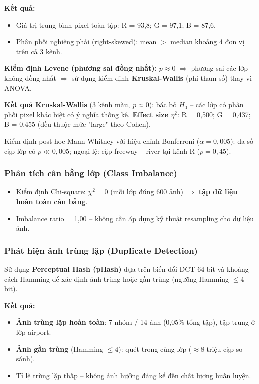 \documentclass[12pt,a4paper]{article}
\let\oldtextbf\textbf
\renewcommand{\textbf}[1]{\oldtextbf{\textcolor{hcmublue}{#1}}}
\begin{document}
\textbf{Kết quả:}
\begin{itemize}
    \item Giá trị trung bình pixel toàn tập: R = 93,8; G = 97,1; B = 87,6.
    \item Phân phối nghiêng phải (right-skewed): mean $>$ median khoảng 4 đơn vị trên cả 3 kênh.
\end{itemize}

\textbf{Kiểm định Levene (phương sai đồng nhất):} $p \approx 0$ $\Rightarrow$ phương sai các lớp không đồng nhất $\Rightarrow$ sử dụng kiểm định \textbf{Kruskal-Wallis} (phi tham số) thay vì ANOVA.

\textbf{Kết quả Kruskal-Wallis} (3 kênh màu, $p \approx 0$): bác bỏ $H_0$ -- các lớp có phân phối pixel khác biệt có ý nghĩa thống kê. \textbf{Effect size $\eta^2$}: R = 0,500; G = 0,437; B = 0,455 (đều thuộc mức "large" theo Cohen).

Kiểm định post-hoc Mann-Whitney với hiệu chỉnh Bonferroni ($\alpha = 0{,}005$): đa số cặp lớp có $p \ll 0{,}005$; ngoại lệ: cặp freeway -- river tại kênh R ($p = 0{,}45$).

\subsubsection{Phân tích cân bằng lớp (Class Imbalance)}

\begin{itemize}
    \item Kiểm định Chi-square: $\chi^2 = 0$ (mỗi lớp đúng 600 ảnh) $\Rightarrow$ \textbf{tập dữ liệu hoàn toàn cân bằng}.
    \item Imbalance ratio = 1,00 -- không cần áp dụng kỹ thuật resampling cho dữ liệu ảnh.
\end{itemize}

\subsubsection{Phát hiện ảnh trùng lặp (Duplicate Detection)}

Sử dụng \textbf{Perceptual Hash (pHash)} dựa trên biến đổi DCT 64-bit và khoảng cách Hamming để xác định ảnh trùng hoặc gần trùng (ngưỡng Hamming $\leq 4$ bit).

\textbf{Kết quả:}
\begin{itemize}
    \item \textbf{Ảnh trùng lặp hoàn toàn}: 7 nhóm / 14 ảnh (0,05\% tổng tập), tập trung ở lớp airport.
    \item \textbf{Ảnh gần trùng} (Hamming $\leq 4$): quét trong cùng lớp ($\approx 8$ triệu cặp so sánh).
    \item Tỉ lệ trùng lặp thấp -- không ảnh hưởng đáng kể đến chất lượng huấn luyện.
\end{itemize}
\end{document}
